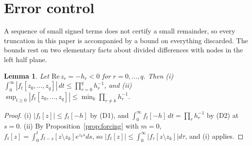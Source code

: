 \documentclass[aps,pra,superscriptaddress,floatfix,longbibliography,twocolumn]{revtex4-2}
\newtheorem{lemma}{Lemma}
\begin{document}
\section{Error control}\label{sec:error}

A sequence of small signed terms does not certify a small remainder, so every truncation in this paper is accompanied by a bound on everything discarded. The bounds rest on two elementary facts about divided differences with nodes in the left half plane.

\begin{lemma}\label{lem:dd}
Let $\mathrm{Re}\,z_r=-h_r<0$ for $r=0,\dots,q$. Then
(i) $\int_0^\infty|f_t[z_0,\dots,z_q]|\,dt\le\prod_{r=0}^q h_r^{-1}$, and
(ii) $\sup_{t\ge0}|f_t[z_0,\dots,z_q]|\le\min_k\prod_{r\neq k}h_r^{-1}$.
\end{lemma}
\begin{proof}
(i) $|f_t[z]|\le f_t[-h]$ by (D1), and $\int_0^\infty f_t[-h]\,dt=\prod_r h_r^{-1}$ by (D2) at $s=0$. (ii) By Proposition~\ref{prop:forcing} with $m=0$, $f_t[z]=\int_0^tf_{t-s}[z\setminus z_k]e^{z_ks}ds$, so $|f_t[z]|\le\int_0^\infty|f_\tau[z\setminus z_k]|d\tau$, and (i) applies.
\end{proof}
\end{document}
